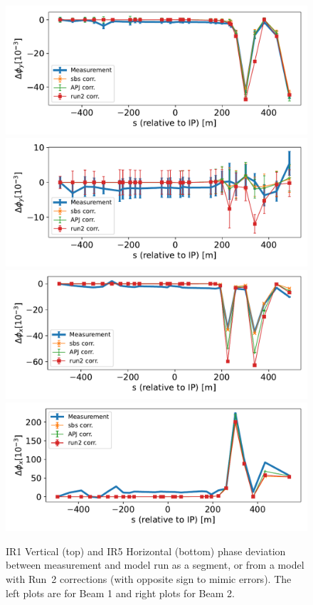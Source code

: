 \documentclass{cernatsnote}
\begin{document}
\begin{figure}
  \includegraphics[width=0.5\linewidth]{local_corr/beam1_y_IP1.pdf}  
  \includegraphics[width=0.5\linewidth]{local_corr/beam2_y_IP1.pdf}  
  \includegraphics[width=0.5\linewidth]{local_corr/beam1_x_IP5.pdf}  
  \includegraphics[width=0.5\linewidth]{local_corr/beam2_x_IP5.pdf}  
\caption{IR1 Vertical (top) and IR5 Horizontal (bottom) phase deviation between measurement and model run as a segment, or from a model with Run~2 corrections (with opposite sign to mimic errors). The left plots are for Beam 1 and right plots for Beam 2.}
\label{fig:local_ip15}
\end{figure}
\end{document}
